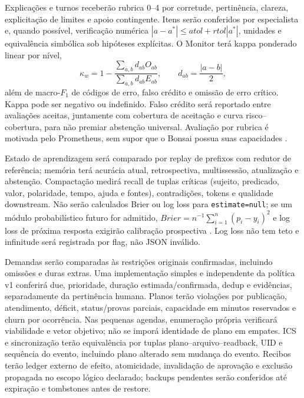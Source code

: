 \documentclass[12pt]{article}
\let\cite\citep
\newcommand{\code}[1]{\nolinkurl{#1}}
\begin{document}
Explicações e turnos receberão rubrica 0--4 por corretude, pertinência, clareza, explicitação de limites e apoio contingente. Itens serão conferidos por especialista e, quando possível, verificação numérica $|a-a^*|\leq atol+rtol|a^*|$, unidades e equivalência simbólica sob hipóteses explícitas. O Monitor terá kappa ponderado linear por nível,
\begin{equation}
 \kappa_w=1-\frac{\sum_{a,b}d_{ab}O_{ab}}{\sum_{a,b}d_{ab}E_{ab}},
 \qquad d_{ab}=\frac{|a-b|}{2},
\end{equation}
além de macro-$F_1$ de códigos de erro, falso crédito e omissão de erro crítico. Kappa pode ser negativo ou indefinido. Falso crédito será reportado entre avaliações aceitas, juntamente com cobertura de aceitação e curva risco--cobertura, para não premiar abstenção universal. Avaliação por rubrica é motivada pelo Prometheus, sem supor que o Bonsai possua suas capacidades \cite{kim2024prometheus}.

Estado de aprendizagem será comparado por replay de prefixos com redutor de referência; memória terá acurácia atual, retrospectiva, multissessão, atualização e abstenção. Compactação medirá recall de tuplas críticas (sujeito, predicado, valor, polaridade, tempo, ajuda e fontes), contradições, tokens e qualidade downstream. Não serão calculados Brier ou log loss para \code{estimate=null}; se um módulo probabilístico futuro for admitido, $Brier=n^{-1}\sum_{i=1}^{n}(p_i-y_i)^2$ e log loss de próxima resposta exigirão calibração prospectiva \cite{guo2017calibration}. Log loss não tem teto e infinitude será registrada por flag, não JSON inválido.

Demandas serão comparadas às restrições originais confirmadas, incluindo omissões e duras extras. Uma implementação simples e independente da política v1 conferirá due, prioridade, duração estimada/confirmada, dedup e evidências, separadamente da pertinência humana. Planos terão violações por publicação, atendimento, déficit, status/provas parciais, capacidade em minutos reservados e churn por ocorrência. Nas pequenas agendas, enumeração própria verificará viabilidade e vetor objetivo; não se imporá identidade de plano em empates. ICS e sincronização terão equivalência por tuplas plano--arquivo--readback, UID e sequência do evento, incluindo plano alterado sem mudança do evento. Recibos terão ledger externo de efeito, atomicidade, invalidação de aprovação e exclusão propagada no escopo lógico declarado; backups pendentes serão conferidos até expiração e tombstones antes de restore.
\end{document}
